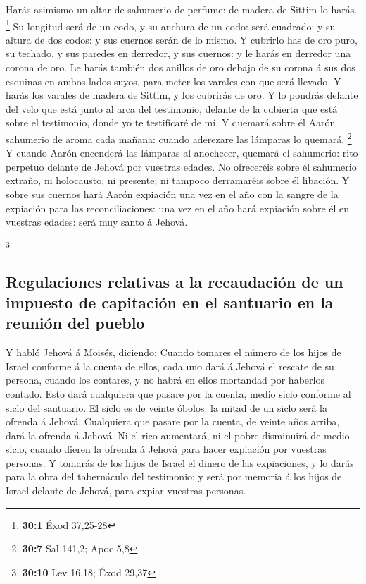  Harás asimismo un altar de sahumerio de perfume: de madera
de Sittim lo harás. \footnote{\textbf{30:1} Éxod 37,25-28} 
Su longitud será de un codo, y su anchura de un codo: será cuadrado: y
su altura de dos codos: y sus cuernos serán de lo mismo.  Y
cubrirlo has de oro puro, su techado, y sus paredes en derredor, y sus
cuernos: y le harás en derredor una corona de oro.  Le harás
también dos anillos de oro debajo de su corona á sus dos esquinas en
ambos lados suyos, para meter los varales con que será llevado.
 Y harás los varales de madera de Sittim, y los cubrirás de
oro.  Y lo pondrás delante del velo que está junto al arca
del testimonio, delante de la cubierta que está sobre el testimonio,
donde yo te testificaré de mí.  Y quemará sobre él Aarón
sahumerio de aroma cada mañana: cuando aderezare las lámparas lo
quemará. \footnote{\textbf{30:7} Sal 141,2; Apoc 5,8}  Y
cuando Aarón encenderá las lámparas al anochecer, quemará el sahumerio:
rito perpetuo delante de Jehová por vuestras edades.  No
ofreceréis sobre él sahumerio extraño, ni holocausto, ni presente; ni
tampoco derramaréis sobre él libación.  Y sobre sus cuernos
hará Aarón expiación una vez en el año con la sangre de la expiación
para las reconciliaciones: una vez en el año hará expiación sobre él en
vuestras edades: será muy santo á Jehová.

\footnote{\textbf{30:10} Lev 16,18; Éxod 29,37}

\hypertarget{regulaciones-relativas-a-la-recaudaciuxf3n-de-un-impuesto-de-capitaciuxf3n-en-el-santuario-en-la-reuniuxf3n-del-pueblo}{%
\subsection{Regulaciones relativas a la recaudación de un impuesto de
capitación en el santuario en la reunión del
pueblo}\label{regulaciones-relativas-a-la-recaudaciuxf3n-de-un-impuesto-de-capitaciuxf3n-en-el-santuario-en-la-reuniuxf3n-del-pueblo}}

 Y habló Jehová á Moisés, diciendo:  Cuando
tomares el número de los hijos de Israel conforme á la cuenta de ellos,
cada uno dará á Jehová el rescate de su persona, cuando los contares, y
no habrá en ellos mortandad por haberlos contado.  Esto
dará cualquiera que pasare por la cuenta, medio siclo conforme al siclo
del santuario. El siclo es de veinte óbolos: la mitad de un siclo será
la ofrenda á Jehová.  Cualquiera que pasare por la cuenta,
de veinte años arriba, dará la ofrenda á Jehová.  Ni el
rico aumentará, ni el pobre disminuirá de medio siclo, cuando dieren la
ofrenda á Jehová para hacer expiación por vuestras personas.
 Y tomarás de los hijos de Israel el dinero de las
expiaciones, y lo darás para la obra del tabernáculo del testimonio: y
será por memoria á los hijos de Israel delante de Jehová, para expiar
vuestras personas.

